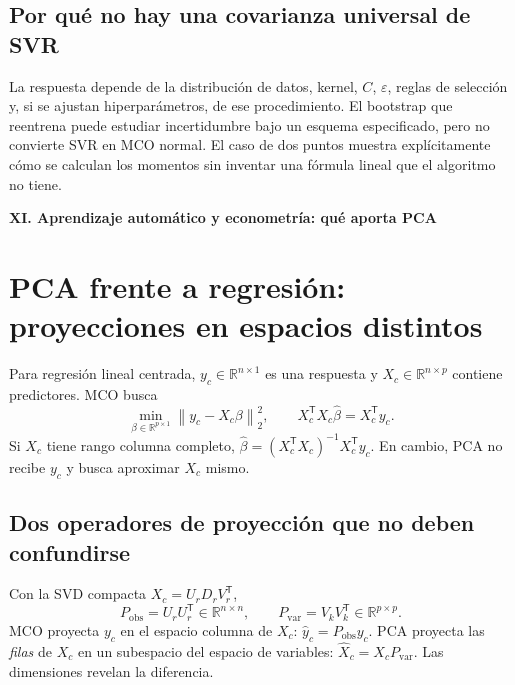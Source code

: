 \documentclass[11pt,a4paper]{article}
\newcommand{\R}{\mathbb R}
\newcommand{\T}{^{\mathsf T}}
\newcommand{\norm}[1]{\left\lVert #1\right\rVert}
\theoremstyle{definition}
\newcommand{\parte}[1]{\par\bigskip\Needspace{8\baselineskip}\begin{center}{\Large\bfseries\color{azul}#1}\end{center}}
\begin{document}
\subsection{Por qué no hay una covarianza universal de SVR}
La respuesta depende de la distribución de datos, kernel, $C$, $\varepsilon$, reglas de selección y, si se ajustan hiperparámetros, de ese procedimiento. El bootstrap que reentrena puede estudiar incertidumbre bajo un esquema especificado, pero no convierte SVR en MCO normal. El caso de dos puntos muestra explícitamente cómo se calculan los momentos sin inventar una fórmula lineal que el algoritmo no tiene.

\parte{XI. Aprendizaje automático y econometría: qué aporta PCA}
\section{PCA frente a regresión: proyecciones en espacios distintos}
Para regresión lineal centrada, $y_c\in\R^{n\times1}$ es una respuesta y $X_c\in\R^{n\times p}$ contiene predictores. MCO busca
\[
\min_{\beta\in\R^{p\times1}}\norm{y_c-X_c\beta}_2^2,
\qquad X_c\T X_c\widehat\beta=X_c\T y_c.
\]
Si $X_c$ tiene rango columna completo, $\widehat\beta=(X_c\T X_c)^{-1}X_c\T y_c$. En cambio, PCA no recibe $y_c$ y busca aproximar $X_c$ mismo.
\subsection{Dos operadores de proyección que no deben confundirse}
Con la SVD compacta $X_c=U_rD_rV_r\T$,
\[
P_{\mathrm{obs}}=U_rU_r\T\in\R^{n\times n},\qquad
P_{\mathrm{var}}=V_kV_k\T\in\R^{p\times p}.
\]
MCO proyecta $y_c$ en el espacio columna de $X_c$: $\widehat y_c=P_{\mathrm{obs}}y_c$. PCA proyecta las \emph{filas} de $X_c$ en un subespacio del espacio de variables: $\widehat X_c=X_cP_{\mathrm{var}}$. Las dimensiones revelan la diferencia.
\end{document}
